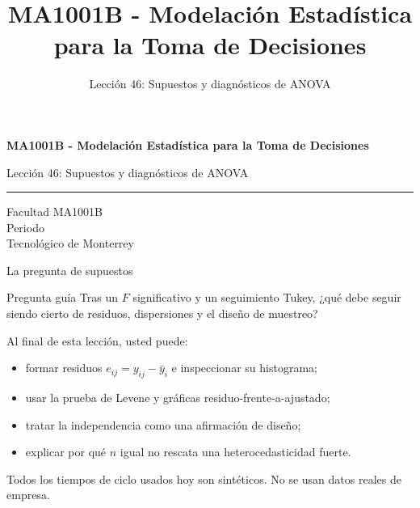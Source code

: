 \documentclass[aspectratio=169,10pt,spanish]{beamer}
\title{MA1001B - Modelación Estadística para la Toma de Decisiones}
\subtitle{Lección 46: Supuestos y diagnósticos de ANOVA}
\author{}
\institute{Tecnol\'ogico de Monterrey}
\date{}
\begin{document}
\begin{frame}[plain]
  \vspace{1.2cm}
  {\Large\bfseries MA1001B - Modelación Estadística para la Toma de Decisiones\par}
  \vspace{0.7cm}
  {\large Lección 46: Supuestos y diagnósticos de ANOVA\par}
  \vspace{0.7cm}
  {\color{TecRojo}\rule{\textwidth}{1.2pt}}
  \vspace{0.8cm}

  Facultad MA1001B\\[0.3cm]
  Periodo\\[0.3cm]
  Tecnol\'ogico de Monterrey
\end{frame}

\begin{frame}{La pregunta de supuestos}
  \begin{alertblock}{Pregunta guía}
    Tras un $F$ significativo y un seguimiento Tukey, ¿qué debe seguir
    siendo cierto de residuos, dispersiones y el diseño de muestreo?
  \end{alertblock}

  \vspace{0.6em}
  Al final de esta lección, usted puede:
  \begin{itemize}
    \item formar residuos $e_{ij}=y_{ij}-\bar y_i$ e inspeccionar su
      histograma;
    \item usar la prueba de Levene y gráficas residuo-frente-a-ajustado;
    \item tratar la independencia como una afirmación de diseño;
    \item explicar por qué $n$ igual no rescata una heterocedasticidad
      fuerte.
  \end{itemize}

  \vfill
  \scriptsize Todos los tiempos de ciclo usados hoy son sintéticos. No se usan datos reales de empresa.
\end{frame}
\end{document}
